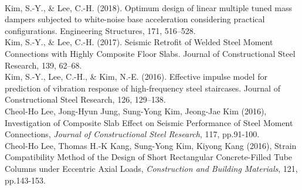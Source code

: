 \documentclass[10pt, a4paper]{article}
\newcommand{\years}[1]{\marginnote{\scriptsize #1}}
\begin{document}
\\
\years{2018}Kim, S.-Y., \& Lee, C.-H. (2018). Optimum design of linear multiple tuned mass dampers subjected to white-noise base acceleration considering practical configurations. Engineering Structures, 171, 516–528.
\\
\years{2017}Kim, S.-Y., \& Lee, C.-H. (2017). Seismic Retrofit of Welded Steel Moment Connections with Highly Composite Floor Slabs. Journal of Constructional Steel Research, 139, 62–68.
\\
\years{2016}Kim, S.-Y., Lee, C.-H., \& Kim, N.-E. (2016). Effective impulse model for prediction of vibration response of high-frequency steel staircases. Journal of Constructional Steel Research, 126, 129–138.
\\
Cheol-Ho Lee, Jong-Hyun Jung, Sung-Yong Kim, Jeong-Jae Kim (2016), Investigation of Composite Slab Effect on Seismic Performance of Steel Moment Connections, \emph{Journal of Constructional Steel Research}, 117, pp.91-100.\\
Cheol-Ho Lee, Thomas H.-K Kang, Sung-Yong Kim, Kiyong Kang (2016), Strain Compatibility Method of the Design of Short Rectangular Concrete-Filled Tube Columns under Eccentric Axial Loads, \emph{Construction and Building Materials}, 121, pp.143-153.\\
\end{document}
